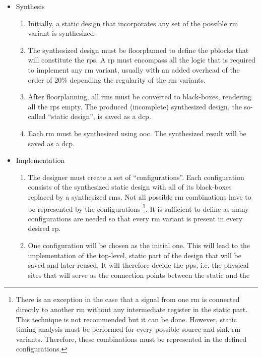 \begin{itemize}
\item	Synthesis
	\begin{enumerate}
	\item	Initially, a static design that incorporates any set of the possible
		\gls{rm} variant is synthesized.
	\item	The synthesized design must be floorplanned to define the \glspl{pblock} that
		will constitute the \glspl{rp}. A \gls{rp} must encompass all the logic that is required
		to implement any \gls{rm} variant, usually with an added overhead of the order of 20\%
		depending the regularity of the \gls{rm} variants.
	\item	After floorplanning, all \glspl{rm} must be converted to black-boxes,
		rendering all the \glspl{rp} empty. The produced (incomplete) synthesized design,
		the so-called ``static design'', is saved as a \gls{dcp}.
	\item	Each \gls{rm} must be synthesized using \gls{ooc}.
		The synthesized result will be saved as a \gls{dcp}.
	\end{enumerate}
\item	Implementation
	\begin{enumerate}
	\item	The designer must create a set of ``configurations''.
		Each configuration consists of the synthesized static design
		with all of its black-boxes replaced by a synthesized \glspl{rm}.
		Not all possible \gls{rm} combinations have to be represented by the configurations
		\footnote{
			There is an exception in the case that a signal from one \gls{rm}
			is connected directly to another \gls{rm} without any
			intermediate register in the static part.
			This technique is not recommended but it can be done.
			However, static timing analysis must be performed for every possible
			source and sink \gls{rm} variants.
			Therefore, these combinations must be represented in the defined configurations.
		}.
		It is sufficient to define as many configurations are needed so that
		every \gls{rm} variant is present in every desired \gls{rp}.
	\item	One configuration will be chosen as the initial one.
		This will lead to the implementation of the top-level,
		static part of the design that will be saved and later reused.
		It will therefore decide the \glspl{pp}, i.e. the physical
		sites that will serve as the connection points between the static and the

\end{enumerate}
\end{itemize}
